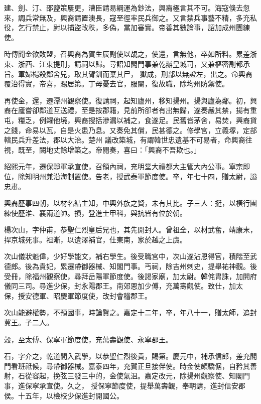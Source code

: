 \begin{pinyinscope}
 建、劍、汀、邵鹽策屢更，漕臣請易綱運為鈔法，興裔極言其不可。海寇倏去忽來，調兵常無及，興裔請置澳長，寇至徑率民兵御之。又言禁兵事藝不精，多充私役，乞行禁止，尉以捕盜改秩，多偽，當加審實。帝善其數論事，詔加成州團練使。



 時傳聞金欲敗盟，召興裔為賀生辰副使以覘之，使還，言無他，卒如所料。累差浙東、浙西、江東提刑，請祠以歸。尋詔知閣門事兼乾辦皇城司，又兼樞密副都承旨。軍婦楊殺鄰舍兒，取其臂釧而棄其尸，
 獄成，刑部以無證左，出之。命興裔覆治得實，帝喜，賜居第。丁母憂去官，服闋，復故職，除均州防禦使。



 再使金，還，遷潭州觀察使。復請祠，起知廬州，移知揚州。揚與廬為鄰。初，興裔在廬嘗卻鄰道互送禮，至是按郡籍，見前所卻者有出無歸，遂奏嚴其禁，揚有重屯，糧乏，例糴他境，興裔搜括滲漏以補之，食遂足。民舊皆茅舍，易焚，興裔貸之錢，命易以瓦，自是火患乃息。又奏免其償，民甚德之。修學宮，立義塚，定部轄民兵升差法，郡以大治。楚州
 議改築城，有謂韓世忠遺基不可易者，命興裔往視，既至，闕地丈餘增築之。帝閱奏，喜曰：「興裔不吾欺也。」



 紹熙元年，遷保靜軍承宣使，召領內祠，充明堂大禮都大主管大內公事。寧宗即位，除知明州兼沿海制置使。告老，授武泰軍節度使。卒，年七十四，贈太尉，謚忠肅。



 興裔歷事四朝，以材名結主知，中興外族之賢，未有其比。子三人：挺，以橫行團練使歷淮、襄兩道帥。損，登進士甲科，與抗皆有位於朝。



 楊次山，字仲甫，恭聖仁烈皇后兄也，其先開封人。曾祖全，以材武奮，靖康末，捍京城死事。祖漸，以遺澤補官，仕東南，家於越之上虞。



 次山儀狀魁偉，少好學能文，補右學生。後受職宮中，次山遂沾恩得官，積階至武德郎。後為貴妃，累遷帶御器械、知閣門事。丐祠，除吉州刺史，提舉祐神觀。後受冊，除福州觀察使，尋拜岳陽軍節度使。後謁家廟，加太尉。韓侂胄誅，加開府儀同三司。尋進少保，封永陽郡王。南郊恩加少傅，充萬壽觀使。致仕，加太
 保，授安德軍、昭慶軍節度使，改封會稽郡王。



 次山能避權勢，不預國事，時論賢之。嘉定十二年，卒，年八十一，贈太師，追封冀王。子二人。



 穀，至太傅、保寧軍節度使，充萬壽觀使、永寧郡王。



 石，字介之，乾道間入武學，以恭聖仁烈後貴，賜第。慶元中，補承信郎，差充閣門看班祗候，尋帶御器械。嘉泰四年，充賀正旦接伴使。時金使頗驕倨，自矜其善射，石從容起，挽弦三發三中的，金使氣沮。嘉定改元，除揚州觀察使、知閣門事，進保寧承宣使。久之，
 授保寧節度使，提舉萬壽觀，奉朝請，進封信安郡侯。十五年，以檢校少保進封開國公。




\end{pinyinscope}
